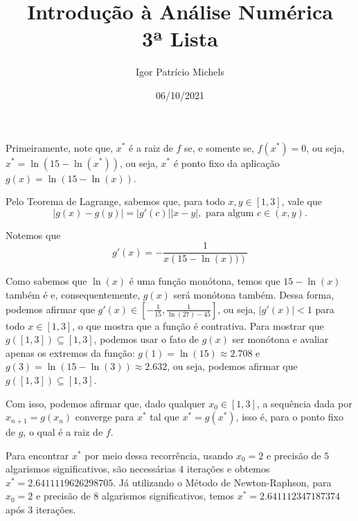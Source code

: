 \documentclass{article}
\title{Introdução à Análise Numérica \\ 3ª Lista}
\author{Igor Patrício Michels}
\date{06/10/2021}
\begin{document}
	
	\maketitle
	
	Primeiramente, note que, $x^*$ é a raiz de $f$ se, e somente se, $f(x^*) = 0$, ou seja, $x^* = \ln{\left(15 - \ln{\left(x^*\right)}\right)}$, ou seja, $x^*$ é ponto fixo da aplicação $g(x) = \ln{\left(15 - \ln{\left(x\right)}\right)}$.
	
	Pelo Teorema de Lagrange, sabemos que, para todo $x, y\in [1, 3]$, vale que
	\[|g(x) - g(y)| = |g'(c)| |x - y|, \text{ para algum } c\in (x, y).\]
	
	Notemos que
	\[g'(x) = -\dfrac{1}{x\left(15 - \ln{\left(x\right)})\right)}\]
	
	Como sabemos que $\ln{\left(x\right)}$ é uma função monótona, temos que $15 - \ln{\left(x\right)}$ também é e, consequentemente, $g(x)$ será monótona também. Dessa forma, podemos afirmar que $g'(x) \in \left[-\frac{1}{15}, \frac{1}{\ln{(27)} - 45}\right]$, ou seja, $|g'(x)| < 1$ para todo $x\in [1, 3]$, o que mostra que a função é contrativa. Para mostrar que $g\left([1, 3]\right)\subseteq [1, 3]$, podemos usar o fato de $g(x)$ ser monótona e avaliar apenas os extremos da função: $g(1) = \ln{(15)}\approx 2.708$ e $g(3) = \ln{\left(15 - \ln{(3)}\right)}\approx 2.632$, ou seja, podemos afirmar que $g\left([1, 3]\right)\subseteq [1, 3]$.
	
	Com isso, podemos afirmar que, dado qualquer $x_0\in [1, 3]$, a sequência dada por $x_{n + 1} = g(x_n)$ converge para $x^*$ tal que $x^* = g(x^*)$, isso é, para o ponto fixo de $g$, o qual é a raiz de $f$.
	
	Para encontrar $x^*$ por meio dessa recorrência, usando $x_0 = 2$ e precisão de $5$ algarismos significativos, são necessárias $4$ iterações e obtemos $x^* = 2.6411119626298705$. Já utilizando o Método de Newton-Raphson, para $x_0 = 2$ e precisão de $8$ algarismos significativos, temos $x^* = 2.641112347187374$ após $3$ iterações.
	
\end{document}
